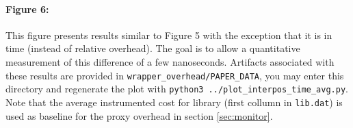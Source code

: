\paragraph*{\textbf{Figure 6:}} This figure presents results similar to Figure 5 with the exception that it is in time (instead of relative overhead). The goal is to allow a quantitative measurement of this difference of a few nanoseconds. Artifacts associated with these results are provided in \texttt{wrapper\_overhead/PAPER\_DATA}, you may enter this directory and regenerate the plot with \texttt{python3 ../plot\_interpos\_time\_avg.py}. Note that the average instrumented cost for library (first collumn in \texttt{lib.dat}) is used as baseline for the proxy overhead in section \ref{sec:monitor}.